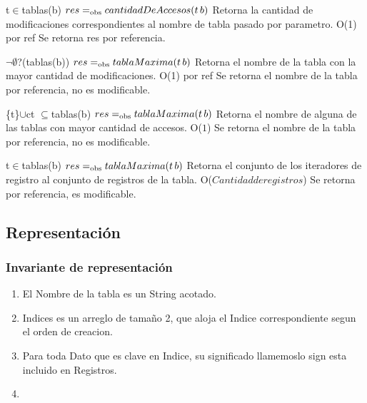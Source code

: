  {t$\in$tablas(b)}
 {$res =_{\mathrm{obs}} cantidadDeAccesos(t\,b)$}
 {Retorna la cantidad de modificaciones correspondientes al nombre de tabla pasado por parametro.}
 {O(1) por ref}
 {Se retorna res por referencia.} 

 {$\neg\emptyset$?(tablas(b))}
 {$res =_{\mathrm{obs}} tablaMaxima(t\,b)$}
 {Retorna el nombre de la tabla con la mayor cantidad de modificaciones.}
 {O(1) por ref}
 {Se retorna el nombre de la tabla por referencia, no es modificable.} 
  
 {\{t\}$\cup$ct $\subseteq$tablas(b)}
 {$res =_{\mathrm{obs}} tablaMaxima(t\,b)$}
 {Retorna el nombre de alguna de las tablas con mayor cantidad de accesos.}
 {O($1$)}
 {Se retorna el nombre de la tabla por referencia, no es modificable.}
  
 {t$\in$tablas(b)}
 {$res =_{\mathrm{obs}} tablaMaxima(t\,b)$}
 {Retorna el conjunto de los iteradores de registro al conjunto de registros de la tabla.}
 {O($Cantidad de registros$)}
 {Se retorna por referencia, es modificable.}
  
 
\newpage
\subsection{Representación}

{
}

\subsubsection*{Invariante de representación}

\begin{enumerate}
  \item El Nombre de la tabla es un String acotado.
  \item Indices es un arreglo de tamaño 2, que aloja el Indice correspondiente segun el orden de creacion.
  \item Para toda Dato que es clave en Indice, su significado llamemoslo sign esta incluido en Registros.
  \item 

\end{enumerate}


